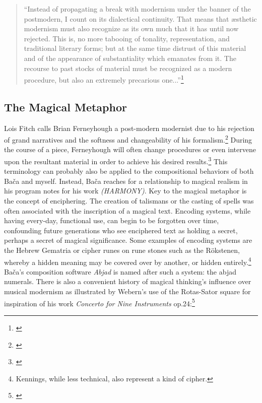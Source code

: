 \begin{quote}
    \singlespacing
    ``Instead of propagating a break with modernism under the banner of the postmodern, I count on its dialectical continuity. That means that æsthetic modernism must also recognize as its own much that it has until now rejected. This is, no more tabooing of tonality, representation, and traditional literary forms; but at the same time distrust of this material and of the appearance of substantiality which emanates from it. The recourse to past stocks of material must be recognized as a modern procedure, but also an extremely precarious one...''\footnote{\citet[5-6]{legacy}}
\end{quote}

\subsection{The Magical Metaphor}

Lois Fitch calls Brian Ferneyhough a post-modern modernist due to his rejection of grand narratives and the softness and changeability of his formalism.\footnote{\citet[159]{legacy}} During the course of a piece, Ferneyhough will often change procedures or even intervene upon the resultant material in order to achieve his desired results.\footnote{\citet[96]{toop}} This terminology can probably also be applied to the compositional behaviors of both Bača and myself. Instead, Bača reaches for a relationship to magical realism in his program notes for his work \textit{(HARMONY)}. Key to the magical metaphor is the concept of enciphering. The creation of talismans or the casting of spells was often associated with the inscription of a magical text. Encoding systems, while having every-day, functional use, can begin to be forgotten over time, confounding future generations who see enciphered text as holding a secret, perhaps a secret of magical significance. Some examples of encoding systems are the Hebrew Gematria or cipher runes on rune stones such as the Rökstenen, whereby a hidden meaning may be covered over by another, or hidden entirely.\footnote{Kennings, while less technical, also represent a kind of cipher.} Bača's composition software \textit{Abjad} is named after such a system: the abjad numerals. There is also a convenient history of magical thinking's influence over musical modernism as illustrated by Webern's use of the Rotas-Sator square for inspiration of his work \textit{Concerto for Nine Instruments} op.24:\footnote{\citet[5]{webern-sator}}

